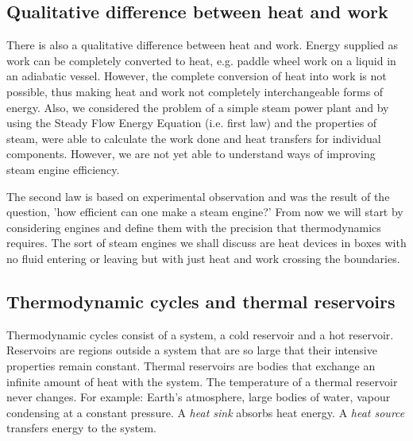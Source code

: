 \documentclass[class=report, crop=false, 12pt,a4paper]{standalone}
\begin{document}
\subsection{Qualitative difference between heat and work}
There is also a qualitative difference between heat and work. Energy supplied as work can be completely converted to heat, e.g. paddle wheel work on a liquid in an adiabatic vessel. However, the complete conversion of heat into work is not possible, thus making heat and work not completely interchangeable forms of energy. Also, we considered the problem of a simple steam power plant and by using the Steady Flow Energy Equation (i.e. first law) and the properties of steam, were able to calculate the work done and heat transfers for individual components. However, we are not yet able to understand ways of improving steam engine efficiency.

The second law is based on experimental observation and was the result of the question, 'how efficient can one make a steam engine?' From now we will start by considering engines and define them with the precision that thermodynamics requires. The sort of steam engines we shall discuss are heat devices in boxes with no fluid entering or leaving but with just heat and work crossing the boundaries.
\subsection{Thermodynamic cycles and thermal reservoirs}
Thermodynamic cycles consist of a system, a cold reservoir and a hot reservoir. Reservoirs are regions outside a system that are so large that their intensive properties remain constant. Thermal reservoirs are bodies that exchange an infinite amount of heat with the system. The temperature of a thermal reservoir never changes. For example: Earth's atmosphere, large bodies of water, vapour condensing at a constant pressure. A \emph{heat sink} absorbs heat energy. A \emph{heat source} transfers energy to the system.
\end{document}

